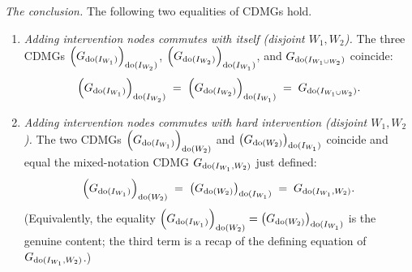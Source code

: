 \documentclass[main]{subfiles}
\begin{document}
\begin{Lem}
    \emph{The conclusion.} The following two equalities of CDMGs hold.
    \begin{enumerate}[label=(\alph*)]
        \item \emph{Adding intervention nodes commutes with itself (disjoint $W_1, W_2$).}
              The three CDMGs $\left ( G_{\operatorname{do}(I_{W_1})} \right )_{\operatorname{do}(I_{W_2})}$, $\left ( G_{\operatorname{do}(I_{W_2})} \right )_{\operatorname{do}(I_{W_1})}$, and $G_{\operatorname{do}(I_{W_1 \cup W_2})}$ coincide:
              \[ \left ( G_{\operatorname{do}(I_{W_1})} \right )_{\operatorname{do}(I_{W_2})} \;=\; \left ( G_{\operatorname{do}(I_{W_2})} \right )_{\operatorname{do}(I_{W_1})} \;=\; G_{\operatorname{do}(I_{W_1 \cup W_2})}. \]
        \item \emph{Adding intervention nodes commutes with hard intervention (disjoint $W_1, W_2$).}
              The two CDMGs $\left ( G_{\operatorname{do}(I_{W_1})} \right )_{\operatorname{do}(W_2)}$ and $\left ( G_{\operatorname{do}(W_2)} \right )_{\operatorname{do}(I_{W_1})}$ coincide and equal the mixed-notation CDMG $G_{\operatorname{do}(I_{W_1}, W_2)}$ just defined:
              \[ \left ( G_{\operatorname{do}(I_{W_1})} \right )_{\operatorname{do}(W_2)} \;=\; \left ( G_{\operatorname{do}(W_2)} \right )_{\operatorname{do}(I_{W_1})} \;=\; G_{\operatorname{do}(I_{W_1}, W_2)}. \]
              (Equivalently, the equality $\left ( G_{\operatorname{do}(I_{W_1})} \right )_{\operatorname{do}(W_2)} = \left ( G_{\operatorname{do}(W_2)} \right )_{\operatorname{do}(I_{W_1})}$ is the genuine content; the third term is a recap of the defining equation of $G_{\operatorname{do}(I_{W_1}, W_2)}$.)
    \end{enumerate}


\end{Lem}
\end{document}
